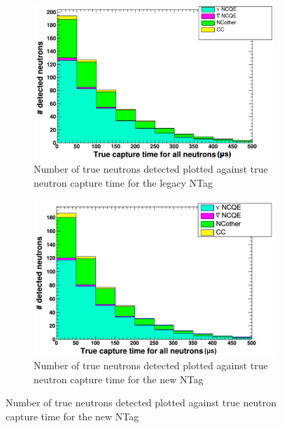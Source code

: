 \begin{figure}
    \centering
     \begin{subfigure}[b]{0.45\linewidth}
      \includegraphics[width=\linewidth]{Figures/TrueCapTimeReductionLegacy.PNG}
      \caption{Number of true neutrons detected plotted against true neutron capture time for the legacy NTag}
      \label{fig:TrueCapTimeReductionLegacy} 
     \end{subfigure}
     \begin{subfigure}[b]{0.45\linewidth}
       \includegraphics[width=\linewidth]{Figures/TrueCapTimeReductionNew.PNG}
        \caption{Number of true neutrons detected plotted against true neutron capture time for the new NTag } 
     \label{fig:TrueCapTimeReductionNew}
      \end{subfigure} 
\end{figure}


